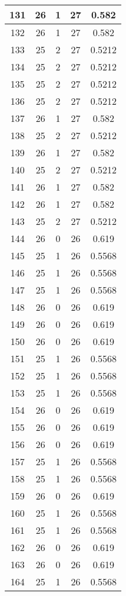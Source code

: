\documentclass[letterpaper, 12pt]{article}
\begin{document}
\begin{longtable}{|c|c|c|c|c|}
\hline
131 & 26 & 1 & 27 & 0.582 \\
\hline
132 & 26 & 1 & 27 & 0.582 \\
\hline
133 & 25 & 2 & 27 & 0.5212 \\
\hline
134 & 25 & 2 & 27 & 0.5212 \\
\hline
135 & 25 & 2 & 27 & 0.5212 \\
\hline
136 & 25 & 2 & 27 & 0.5212 \\
\hline
137 & 26 & 1 & 27 & 0.582 \\
\hline
138 & 25 & 2 & 27 & 0.5212 \\
\hline
139 & 26 & 1 & 27 & 0.582 \\
\hline
140 & 25 & 2 & 27 & 0.5212 \\
\hline
141 & 26 & 1 & 27 & 0.582 \\
\hline
142 & 26 & 1 & 27 & 0.582 \\
\hline
143 & 25 & 2 & 27 & 0.5212 \\
\hline
144 & 26 & 0 & 26 & 0.619 \\
\hline
145 & 25 & 1 & 26 & 0.5568 \\
\hline
146 & 25 & 1 & 26 & 0.5568 \\
\hline
147 & 25 & 1 & 26 & 0.5568 \\
\hline
148 & 26 & 0 & 26 & 0.619 \\
\hline
149 & 26 & 0 & 26 & 0.619 \\
\hline
150 & 26 & 0 & 26 & 0.619 \\
\hline
151 & 25 & 1 & 26 & 0.5568 \\
\hline
152 & 25 & 1 & 26 & 0.5568 \\
\hline
153 & 25 & 1 & 26 & 0.5568 \\
\hline
154 & 26 & 0 & 26 & 0.619 \\
\hline
155 & 26 & 0 & 26 & 0.619 \\
\hline
156 & 26 & 0 & 26 & 0.619 \\
\hline
157 & 25 & 1 & 26 & 0.5568 \\
\hline
158 & 25 & 1 & 26 & 0.5568 \\
\hline
159 & 26 & 0 & 26 & 0.619 \\
\hline
160 & 25 & 1 & 26 & 0.5568 \\
\hline
161 & 25 & 1 & 26 & 0.5568 \\
\hline
162 & 26 & 0 & 26 & 0.619 \\
\hline
163 & 26 & 0 & 26 & 0.619 \\
\hline
164 & 25 & 1 & 26 & 0.5568 \\

\end{longtable}
\end{document}
